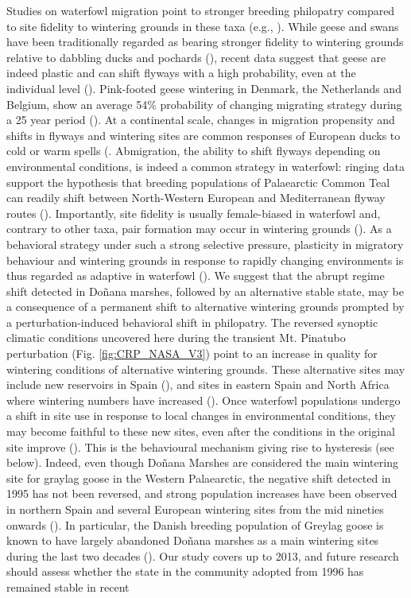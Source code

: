 \documentclass[12pt]{article}
\begin{document}
Studies on waterfowl migration point to stronger breeding philopatry compared to site fidelity to wintering grounds in these taxa (e.g., \cite{Guillemain2005,Davis2014,Clausen2016,Clausen2018a}). While geese and swans have been traditionally regarded as bearing stronger fidelity to wintering grounds relative to dabbling ducks and pochards (\cite{Robertson1999a,Coulson2016}), recent data suggest that geese are indeed plastic and can shift flyways with a high probability, even at the individual level (\cite{Clausen2016,Clausen2018a,Fox2023}). Pink-footed geese wintering in Denmark, the Netherlands and Belgium, show an average 54\% probability of changing migrating strategy during a 25 year period (\cite{Clausen2018a}). At a continental scale, changes in migration propensity and shifts in flyways and wintering sites are common responses of European ducks to cold or warm spells (\cite{Ridgill1990,Adam2015}. Abmigration, the ability to shift flyways depending on environmental conditions, is indeed a common strategy in waterfowl: ringing data support the hypothesis that breeding populations of Palaearctic Common Teal can readily shift between North-Western European and Mediterranean flyway routes (\cite{Guillemain2005,Parejo2015}). Importantly, site fidelity is usually female-biased in waterfowl and, contrary to other taxa, pair formation may occur in wintering grounds (\cite{Robertson1999a}). As a behavioral strategy under such a strong selective pressure, plasticity in migratory behaviour and wintering grounds in response to rapidly changing environments is thus regarded as adaptive in waterfowl (\cite{Clausen2016,Clausen2018a}). We suggest that the abrupt regime shift detected in Doñana marshes, followed by an alternative stable state, may be a consequence of a permanent shift to alternative wintering grounds prompted by a perturbation-induced behavioral shift in philopatry. The reversed synoptic climatic conditions uncovered here during the transient Mt. Pinatubo perturbation (Fig. \ref{fig:CRP_NASA_V3}) point to an increase in quality for wintering conditions of alternative wintering grounds. These alternative sites may include new reservoirs in Spain (\cite{NAVEDO2012}), and sites in eastern Spain and North Africa where wintering numbers have increased (\cite{Kleijn2014,DeArrudaAlmeida2019}). Once waterfowl populations undergo a shift in site use in response to local changes in environmental conditions, they may become faithful to these new sites, even after the conditions in the original site improve (\cite{Clausen2016,Clausen2018a}). This is the behavioural mechanism giving rise to hysteresis (see below). Indeed, even though Doñana Marshes are considered the main wintering site for graylag goose in the Western Palaearctic, the negative shift detected in 1995 has not been reversed, and strong population increases have been observed in northern Spain and several European wintering sites from the mid nineties onwards (\cite{Madsen1999,Ramo2015}). In particular, the Danish breeding population of Greylag goose is known to have largely abandoned Doñana marshes as a main wintering sites during the last two decades (\cite{Clausen2023}). Our study covers up to 2013, and future research should assess whether the state in the community adopted from 1996 has remained stable in recent 
\end{document}
